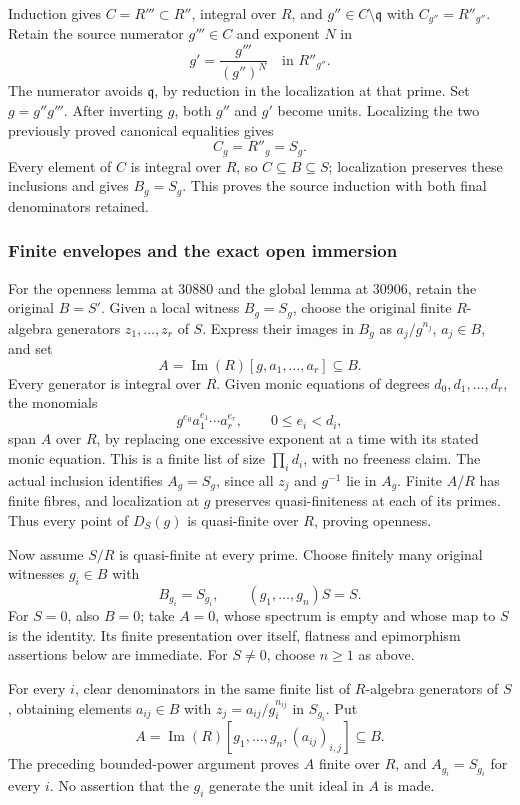 Induction gives \(C=R'''\subset R''\), integral over \(R\), and \(g''\in C\setminus\mathfrak q\) with \(C_{g''}=R''_{g''}\). Retain the source numerator \(g'''\in C\) and exponent \(N\) in \[
 g'=\frac{g'''}{(g'')^N}\quad\text{in }R''_{g''}.
\] The numerator avoids \(\mathfrak q\), by reduction in the localization at that prime. Set \(g=g''g'''\). After inverting \(g\), both \(g''\) and \(g'\) become units. Localizing the two previously proved canonical equalities gives \[
 C_g=R''_g=S_g.
\] Every element of \(C\) is integral over \(R\), so \(C\subseteq B\subseteq S\); localization preserves these inclusions and gives \(B_g=S_g\). This proves the source induction with both final denominators retained.

\subsubsection{Finite envelopes and the exact open immersion}\label{finite-envelopes-and-the-exact-open-immersion}

For the openness lemma at 30880 and the global lemma at 30906, retain the original \(B=S'\). Given a local witness \(B_g=S_g\), choose the original finite \(R\)-algebra generators \(z_1,\ldots,z_r\) of \(S\). Express their images in \(B_g\) as \(a_j/g^{n_j}\), \(a_j\in B\), and set \[
 A=\operatorname{Im}(R)[g,a_1,\ldots,a_r]\subseteq B.
\] Every generator is integral over \(R\). Given monic equations of degrees \(d_0,d_1,\ldots,d_r\), the monomials \[
 g^{e_0}a_1^{e_1}\cdots a_r^{e_r},
 \qquad 0\leq e_i<d_i,
\] span \(A\) over \(R\), by replacing one excessive exponent at a time with its stated monic equation. This is a finite list of size \(\prod_i d_i\), with no freeness claim. The actual inclusion identifies \(A_g=S_g\), since all \(z_j\) and \(g^{-1}\) lie in \(A_g\). Finite \(A/R\) has finite fibres, and localization at \(g\) preserves quasi-finiteness at each of its primes. Thus every point of \(D_S(g)\) is quasi-finite over \(R\), proving openness.

Now assume \(S/R\) is quasi-finite at every prime. Choose finitely many original witnesses \(g_i\in B\) with \[
 B_{g_i}=S_{g_i},\qquad (g_1,\ldots,g_n)S=S.
\] For \(S=0\), also \(B=0\); take \(A=0\), whose spectrum is empty and whose map to \(S\) is the identity. Its finite presentation over itself, flatness and epimorphism assertions below are immediate. For \(S\ne0\), choose \(n\geq1\) as above.

For every \(i\), clear denominators in the same finite list of \(R\)-algebra generators of \(S\), obtaining elements \(a_{ij}\in B\) with \(z_j=a_{ij}/g_i^{n_{ij}}\) in \(S_{g_i}\). Put \[
 A=\operatorname{Im}(R)[g_1,\ldots,g_n,(a_{ij})_{i,j}]\subseteq B.
\] The preceding bounded-power argument proves \(A\) finite over \(R\), and \(A_{g_i}=S_{g_i}\) for every \(i\). No assertion that the \(g_i\) generate the unit ideal in \(A\) is made.

